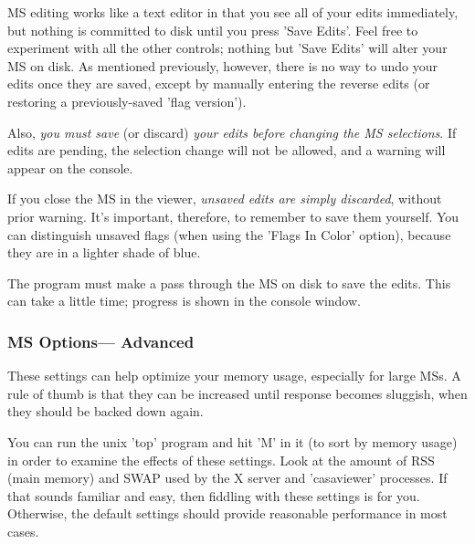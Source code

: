 \begin{itemize}
MS editing works like a text editor in that
you see all of your edits immediately, but nothing is committed to disk
until you press 'Save Edits'.  Feel free to experiment with all the other
controls; nothing but 'Save Edits' will alter your MS on disk. 
As mentioned previously, however, there is no way to undo your edits once
they are saved, except by manually entering the reverse edits (or restoring
a previously-saved 'flag version').

Also, {\it you must save} (or discard) {\it your edits before changing the 
MS selections}.  If edits are pending, the selection change will not be 
allowed, and a warning will appear on the console.  

If you close the MS in the viewer, {\it unsaved edits are simply discarded},
without prior warning.  It's important, therefore, to remember to save them
yourself.  You can distinguish unsaved flags (when using the 'Flags In Color'
option), because they are in a lighter shade of blue.

The program must make a pass through the MS on disk to save the edits.
This can take a little time; progress is shown in the console window.

\end{itemize}

\subsubsection{MS Options---  Advanced}
\label{section:display.ms.adjust.adv}

These settings can help optimize your memory usage, especially for
large MSs.  A rule of thumb is that they can be increased until response
becomes sluggish, when they should be backed down again.

You can run the unix 'top' program and hit 'M' in it (to sort by memory
usage) in order to examine the effects of these settings.  Look at the
amount of RSS (main memory) and SWAP used by the X server and 'casaviewer'
processes.  If that sounds familiar and easy, then fiddling with these
settings is for you.  Otherwise, the default settings should provide
reasonable performance in most cases.

